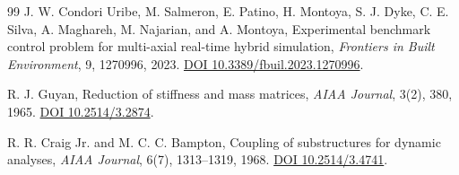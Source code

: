 \documentclass[11pt,a4paper]{article}
\begin{document}
\begin{thebibliography}{99}
J. W. Condori Uribe, M. Salmeron, E. Patino, H. Montoya, S. J. Dyke, C. E. Silva, A. Maghareh, M. Najarian, and A. Montoya, Experimental benchmark control problem for multi-axial real-time hybrid simulation, \emph{Frontiers in Built Environment}, 9, 1270996, 2023. \href{https://doi.org/10.3389/fbuil.2023.1270996}{DOI 10.3389/fbuil.2023.1270996}.

R. J. Guyan, Reduction of stiffness and mass matrices, \emph{AIAA Journal}, 3(2), 380, 1965. \href{https://doi.org/10.2514/3.2874}{DOI 10.2514/3.2874}.

R. R. Craig Jr. and M. C. C. Bampton, Coupling of substructures for dynamic analyses, \emph{AIAA Journal}, 6(7), 1313--1319, 1968. \href{https://doi.org/10.2514/3.4741}{DOI 10.2514/3.4741}.
\end{thebibliography}
\end{document}
